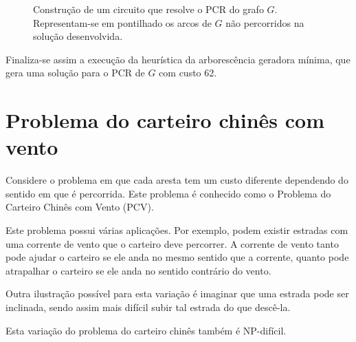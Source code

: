 \begin{enumerate}
\begin{figure}[H]
            \caption{Construção de um circuito que resolve o PCR do grafo $G$. Representam-se em pontilhado os arcos de $G$ não percorridos na solução desenvolvida.}
            \label{solucaoPCR}
        \end{figure}
	\end{enumerate}

    Finaliza-se assim a execução da heurística da arborescência geradora mínima, que gera uma solução para o PCR de $G$ com custo 62.

    \section{Problema do carteiro chinês com vento}

        Considere o problema em que cada aresta tem um custo diferente dependendo do sentido em que é percorrida. Este problema é conhecido como o Problema do Carteiro Chinês com Vento (PCV).

        Este problema possui várias aplicações. 
        Por exemplo, podem existir estradas com uma corrente de vento que o carteiro deve percorrer. 
        A corrente de vento tanto pode ajudar o carteiro se ele anda no mesmo sentido que a corrente, quanto pode atrapalhar o carteiro se ele anda no sentido contrário do vento.

        Outra ilustração possível para esta variação é imaginar que uma estrada pode ser inclinada, sendo assim mais difícil subir tal estrada do que descê-la.

        Esta variação do problema do carteiro chinês também é NP-difícil.

